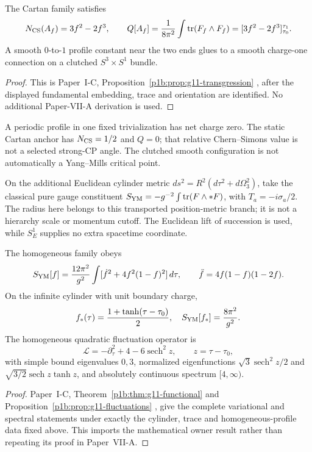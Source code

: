 \documentclass[12pt,a4paper]{article}
\begin{document}
\begin{proposition}
\label{p10:prop:v199-cartan-transgression}
The Cartan family satisfies
\[
 N_{\rm CS}(A_f)=3f^2-2f^3,\qquad
 Q[A_f]=\frac1{8\pi^2}\int\operatorname{tr}(F_f\wedge F_f)
       =[3f^2-2f^3]_{\tau_0}^{\tau_1}.
\]
A smooth \(0\)-to-\(1\) profile constant near the two ends glues to a
smooth charge-one connection on a clutched \(S^3\times S^1\) bundle.
\end{proposition}
\begin{proof}
This is Paper~I-C, Proposition~\ref{p1b:prop:g11-transgression}
\cite{Kugelmann2026Paper1B}, after the displayed fundamental embedding,
trace and orientation are identified.  No additional Paper-VII-A derivation is
used.
\end{proof}
A periodic profile in one fixed trivialization has net charge zero.
The static Cartan anchor has \(N_{\rm CS}=1/2\) and \(Q=0\); that relative
Chern--Simons value is not a selected strong-CP angle.  The clutched smooth
configuration is not automatically a Yang--Mills critical point.

On the additional Euclidean cylinder metric
\(ds^2=R^2(d\tau^2+d\Omega_3^2)\), take the classical pure gauge
constituent \(S_{\rm YM}=-g^{-2}\int\operatorname{tr}(F\wedge *F)\),
with \(T_a=-i\sigma_a/2\).  The radius here belongs to this transported
position-metric branch; it is not a hierarchy scale or momentum cutoff.
The Euclidean lift of succession is used, while \(S_E^1\) supplies no
extra spacetime coordinate.

\begin{proposition}
\label{p10:prop:v199-yang-mills-kink}
The homogeneous family obeys
\[
 S_{\rm YM}[f]=\frac{12\pi^2}{g^2}\int
 [\dot f^2+4f^2(1-f)^2]\,d\tau,\qquad
 \ddot f=4f(1-f)(1-2f).
\]
On the infinite cylinder with unit boundary charge,
\[
 f_*(\tau)=\frac{1+\tanh(\tau-\tau_0)}2,\quad
 S_{\rm YM}[f_*]=\frac{8\pi^2}{g^2}.
\]
The homogeneous quadratic fluctuation operator is
\[
 \mathcal L=-\partial_\tau^2+4-6\operatorname{sech}^2z,
 \qquad z=\tau-\tau_0,
\]
with simple bound eigenvalues \(0,3\), normalized eigenfunctions
\(\sqrt3\operatorname{sech}^2z/2\) and
\(\sqrt{3/2}\operatorname{sech}z\tanh z\), and absolutely continuous
spectrum \([4,\infty)\).
\end{proposition}
\begin{proof}
Paper~I-C, Theorem~\ref{p1b:thm:g11-functional} and
Proposition~\ref{p1b:prop:g11-fluctuations}
\cite{Kugelmann2026Paper1B}, give the complete variational and spectral
statements under exactly the cylinder, trace and homogeneous-profile data
fixed above.  This imports the mathematical owner result rather than
repeating its proof in Paper~VII-A.
\end{proof}
\end{document}
